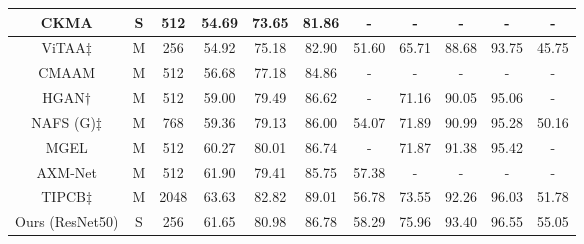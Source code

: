 \documentclass{bmvc2k}
\newcommand{\first}[1]{\textcolor{myred}{#1}}
\newcommand{\second}[1]{\textcolor{myblue}{#1}}
\begin{document}
\begin{table}[t]
\begin{center}
{\begin{tabular}{|c|c|c|c|c|c|c|c|c|c|c|}
\rowcolor[RGB]{230,230,230}
CKMA \cite{chen2021cmka}                             & S   & 512                             & 54.69           & 73.65           & 81.86            & -            & -               & -               & -                & -            \\ \hline
ViTAA$\ddagger$ \cite{wang2020vitaa}                           & M & 256                              & 54.92           & 75.18           & 82.90            & 51.60        & 65.71           & 88.68           & 93.75            & 45.75        \\ \hline
CMAAM \cite{aggarwal2020cmaam}                            & M  & 512                             & 56.68           & 77.18           & 84.86            & -            & -               & -               & -                & -            \\ \hline
HGAN$\dagger$ \cite{zheng2020hierarchical}                         & M   & 512                              & 59.00           & 79.49           & 86.62            & -        & 71.16      & 90.05           & 95.06            & -        \\ \hline
NAFS (G)$\ddagger$ \cite{gao2021contextual}                            & M   & 768                           & 59.36           & 79.13          & 86.00            & 54.07            & 71.89               & 90.99               & 95.28                & 50.16            \\ \hline
MGEL \cite{wang2021mgel}                            & M & 512                             & 60.27           & 80.01          & 86.74            & -            & 71.87               & 91.38               & 95.42                & -            \\ \hline
AXM-Net \cite{farooq2021axm}                          & M & 512                             & 61.90           & 79.41           & 85.75            & 57.38       & -               & -               & -                & -            \\ \hline
TIPCB$\ddagger$ \cite{chen2021tipcb}                          & M  & 2048                            & \second{63.63}           & \first{82.82}           & \first{89.01}            & 56.78       & 73.55               & 92.26               & 96.03                & 51.78            \\ \hline
\rowcolor[RGB]{230,230,230}
Ours (ResNet50)                             & S  & 256                                   & 61.65           & 80.98           & 86.78            & \second{58.29}        & \second{75.96}           & \second{93.40}           & \second{96.55}            & \second{55.05}        \\ \hline

\end{tabular}}
\end{center}
\end{table}
\end{document}

